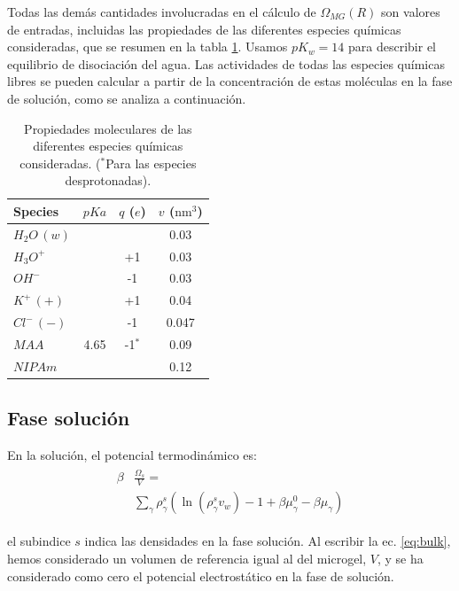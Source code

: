 Todas las dem\'as cantidades involucradas en el c\'alculo de $\Omega_{MG}(R)$ son valores de  entradas, incluidas las propiedades de las diferentes especies qu\'imicas consideradas, que se resumen en la tabla \ref{table:molecules}.
Usamos $pK_w=14$ para describir el equilibrio de disociaci\'on del agua.
Las actividades de todas las especies qu\'imicas libres se pueden calcular a partir de la concentraci\'on de estas mol\'eculas en la fase de soluci\'on, como se analiza a continuaci\'on.


\begin{table}
	\centering
\begin{tabular}{|lccc|}
    \hline
    {Species} & {$pKa$} & {$q$ ($e$)} & {$v$ ($\text{nm}^3$)} \\
      \hline
$H_2O\,(w)$ & ~ & ~ & 0.03\\
$H_3O^+$ & ~ & +1 & 0.03\\
$OH^-$ & ~ & -1 & 0.03\\
$K^+\,(+)$ & ~ & +1 & 0.04\\ 
$Cl^-\,(-)$ & ~ & -1 & 0.047\\
$MAA$ & 4.65 & -1$^\ast$ & 0.09\\
$NIPAm$ & ~ & ~ & 0.12\\
    \hline
  \end{tabular}
 \caption{Propiedades moleculares de las diferentes especies qu\'imicas consideradas.
 	\footnotesize ($^\ast$Para las especies desprotonadas).}
\label{table:molecules} 
\end{table}


\subsection{Fase soluci\'on}

En la soluci\'on, el potencial termodin\'amico es:
%
%
\begin{align}
\begin{aligned}
\beta&\frac{\Omega_s}{V}=\\& \sum_{\gamma   } {\rho^s_\gamma\left(\ln(\rho_\gamma^sv_w) -1 + \beta\mu_\gamma^0 - \beta\mu_\gamma\right)}
\end{aligned}
\label{eq:bulk}
\end{align}

\noindent el subindice  $s$  indica las densidades en la fase soluci\'on.
Al escribir la ec. \ref{eq:bulk}, hemos considerado un volumen de referencia igual al del microgel, $V$, y se ha considerado como cero el potencial electrost\'atico en la fase de soluci\'on.


